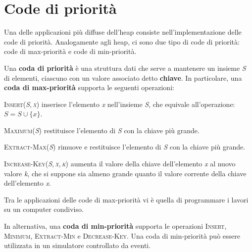 \documentclass[10pt, a4paper]{report}
\begin{document}
\section{Code di priorità}
Una delle applicazioni più diffuse dell'heap consiste nell'implementazione delle code di priorità. Analogamente agli heap, ci sono due tipo di code di priorità: code di max-priorità e code di min-priorità.

Una \textbf{coda di priorità} è una struttura dati che serve a mantenere un insieme \textit{S} di elementi, ciascuno con un valore associato detto \textbf{chiave}. In particolare, una \textbf{coda di max-priorità} supporta le seguenti operazioni:
\begin{description}
\item\textsc{Insert(\textit{S},\,\textit{x})} inserisce l'elemento \textit{x} nell'insieme \textit{S}, che equivale all'operazione: $S = S \cup \{x\}$.
\item\textsc{Maximum(\textit{S})} restituisce l'elemento di \textit{S} con la chiave più grande.
\item\textsc{Extract-Max(\textit{S})} rimuove e restituisce l'elemento di \textit{S} con la chiave più grande.
\item\textsc{Increase-Key(\textit{S},\,\textit{x},\,\textit{k})} aumenta il valore della chiave dell'elemento \textit{x} al nuovo valore \textit{k}, che si suppone sia almeno grande quanto il valore corrente della chiave dell'elemento \textit{x}.
\end{description}
Tra le applicazioni delle code di max-priorità  vi è quella di programmare i lavori su un computer condiviso.

In alternativa, una \textbf{coda di min-priorità} supporta le operazioni \textsc{Insert}, \textsc{Minimum}, \textsc{Extract-Min} e \textsc{Decrease-Key}. Una coda di min-priorità può essere utilizzata in un simulatore controllato da eventi.
\end{document}
